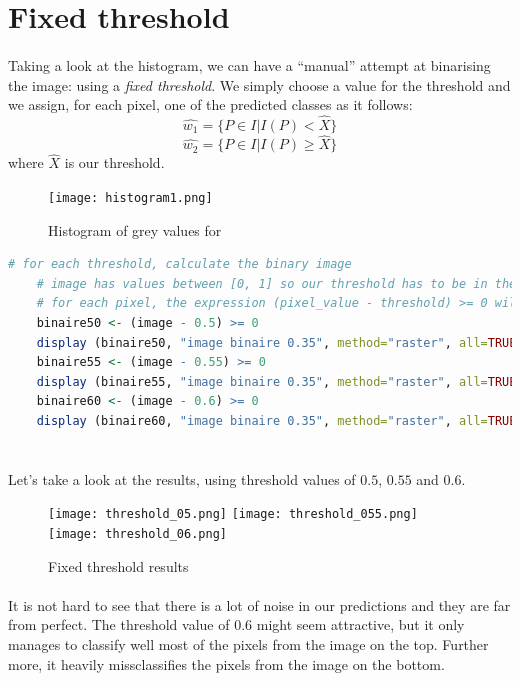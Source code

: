\clearpage


\section{Fixed threshold}
\paragraph{}
Taking a look at the histogram, we can have a ``manual'' attempt at binarising the image: using a \emph{fixed threshold}.
We simply choose a value for the threshold and we assign, for each pixel, one of the predicted classes as it follows:
$$\hat{w_1} = \{P \in I | I(P) < \hat{X}\}$$
$$\hat{w_2} = \{P \in I | I(P) \ge \hat{X}\}$$
where $\hat{X}$ is our threshold.

\begin{figure}[h]
    \centering
    \texttt{[image: histogram1.png]}
    \caption{Histogram of grey values for}
    \label{}
\end{figure}

\begin{lstlisting}[language=R, caption=Using fixed threshold]
    # for each threshold, calculate the binary image
    # image has values between [0, 1] so our threshold has to be in the same range
    # for each pixel, the expression (pixel_value - threshold) >= 0 will assign it to one of two classes: w1 or w2
    binaire50 <- (image - 0.5) >= 0
    display (binaire50, "image binaire 0.35", method="raster", all=TRUE)
    binaire55 <- (image - 0.55) >= 0
    display (binaire55, "image binaire 0.35", method="raster", all=TRUE)
    binaire60 <- (image - 0.6) >= 0
    display (binaire60, "image binaire 0.35", method="raster", all=TRUE)
    
\end{lstlisting}

\clearpage

\paragraph{}
Let's take a look at the results, using threshold values of $0.5$, $0.55$ and $0.6$.

\begin{figure}[h]
    \centering
    \texttt{[image: threshold\_05.png]}
    \texttt{[image: threshold\_055.png]}
    \texttt{[image: threshold\_06.png]}
    \caption{Fixed threshold results}
    \label{}
\end{figure}

\paragraph{}
It is not hard to see that there is a lot of noise in our predictions and they are far from perfect.
The threshold value of $0.6$ might seem attractive, but it only manages to classify well most of the pixels from the image on the top.
Further more, it heavily missclassifies the pixels from the image on the bottom.


